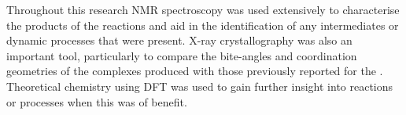 Throughout this research \gls{NMR} spectroscopy was used extensively to characterise the products of the reactions and aid in the identification of any intermediates or dynamic processes that were present.  X-ray crystallography was also an important tool, particularly to compare the bite-angles and coordination geometries of the \tBuxantphos{} complexes produced with those previously reported for the \Phxantphos.  Theoretical chemistry using \gls{DFT} was used to gain further insight into reactions or processes when this was of benefit.


%
%
%
